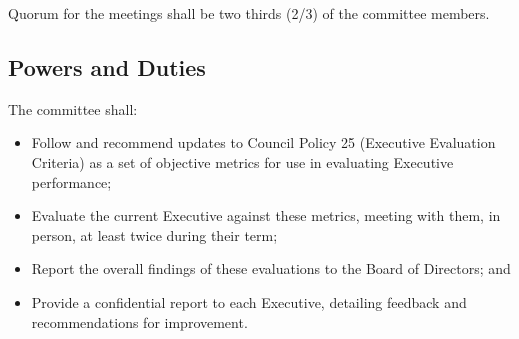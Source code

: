 Quorum for the meetings shall be two thirds (2/3) of the committee members.

\subsection{Powers and Duties}

The committee shall:
\begin{itemize}
    \item Follow and recommend updates to Council Policy 25 (Executive
        Evaluation Criteria) as a set of objective metrics for use in
        evaluating Executive performance;
    \item Evaluate the current Executive against these metrics, meeting with
        them, in person, at least twice during their term;
    \item Report the overall findings of these evaluations to the Board of
        Directors; and
    \item Provide a confidential report to each Executive, detailing feedback
        and recommendations for improvement.
        
\end{itemize}
